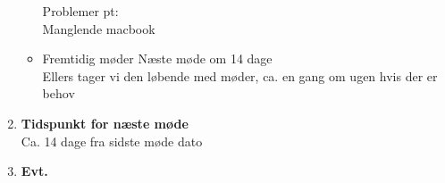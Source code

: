 \begin{enumerate}
\begin{itemize}[-]
			Problemer pt: \\
			Manglende macbook \\
						
			\item Fremtidig møder
			Næste møde om 14 dage \\
			Ellers tager vi den løbende med møder, ca. en gang om ugen hvis der er behov \\
			
				
		\end{itemize}
	
		\item \textbf{Tidspunkt for næste møde} \\
		Ca. 14 dage fra sidste møde dato \\
		\item \textbf{Evt.}
		
	\end{enumerate}

